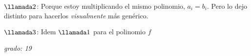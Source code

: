\begin{enumerate}[label=\roman*)]
        $\llamada2$: Porque estoy multiplicando el mismo polinomio, $a_i = b_i$. Pero lo dejo distinto para hacerlos \textit{visualmente} más genérico.

        $\llamada3$: Idem $\llamada1$ para el polinomio $f$

        \textit{grado: 19 }
\end{enumerate}

\begin{aportes}
  \item {}
\end{aportes}
